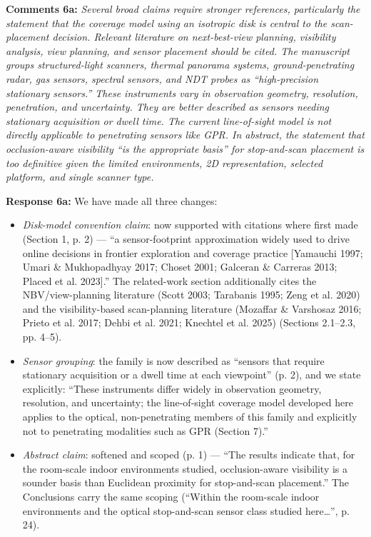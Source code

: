 \documentclass[11pt]{article}
\begin{document}
\medskip

\textbf{Comments 6a:} \emph{Several broad claims require stronger references, particularly the statement that the coverage model using an isotropic disk is central to the scan-placement decision. Relevant literature on next-best-view planning, visibility analysis, view planning, and sensor placement should be cited. The manuscript groups structured-light scanners, thermal panorama systems, ground-penetrating radar, gas sensors, spectral sensors, and NDT probes as “high-precision stationary sensors.” These instruments vary in observation geometry, resolution, penetration, and uncertainty. They are better described as sensors needing stationary acquisition or dwell time. The current line-of-sight model is not directly applicable to penetrating sensors like GPR. In abstract, the statement that occlusion-aware visibility “is the appropriate basis” for stop-and-scan placement is too definitive given the limited environments, 2D representation, selected platform, and single scanner type.}

\textbf{Response 6a:} We have made all three changes:
\begin{itemize}
\item \emph{Disk-model convention claim}: now supported with citations where first made (Section 1, p. 2) — “a sensor-footprint approximation widely used to drive online decisions in frontier exploration and coverage practice [Yamauchi 1997; Umari \& Mukhopadhyay 2017; Choset 2001; Galceran \& Carreras 2013; Placed et al. 2023].” The related-work section additionally cites the NBV/view-planning literature (Scott 2003; Tarabanis 1995; Zeng et al. 2020) and the visibility-based scan-planning literature (Mozaffar \& Varshosaz 2016; Prieto et al. 2017; Dehbi et al. 2021; Knechtel et al. 2025) (Sections 2.1–2.3, pp. 4–5).
\item \emph{Sensor grouping}: the family is now described as “sensors that require stationary acquisition or a dwell time at each viewpoint” (p. 2), and we state explicitly: “These instruments differ widely in observation geometry, resolution, and uncertainty; the line-of-sight coverage model developed here applies to the optical, non-penetrating members of this family and explicitly not to penetrating modalities such as GPR (Section 7).”
\item \emph{Abstract claim}: softened and scoped (p. 1) — “The results indicate that, for the room-scale indoor environments studied, occlusion-aware visibility is a sounder basis than Euclidean proximity for stop-and-scan placement.” The Conclusions carry the same scoping (“Within the room-scale indoor environments and the optical stop-and-scan sensor class studied here…”, p. 24).
\end{itemize}
\end{document}
